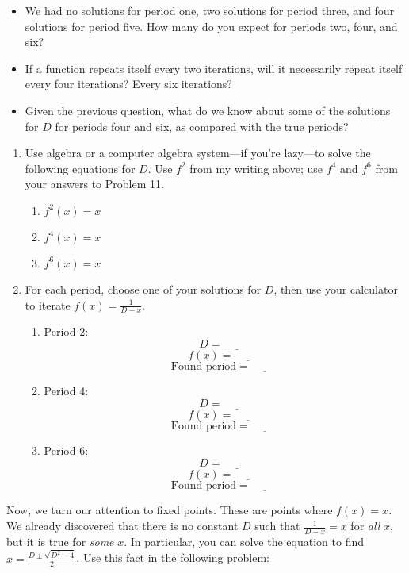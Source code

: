 \documentclass[../gatm.tex]{subfiles}
\begin{document}
\begin{itemize}
\item We had no solutions for period one, two solutions for period three, and four solutions for period five. How many do you expect for periods two, four, and six?
\item If a function repeats itself every two iterations, will it necessarily repeat itself every four iterations? Every six iterations?
\item Given the previous question, what do we know about some of the solutions for $D$ for periods four and six, as compared with the true periods?
\end{itemize}
\begin{enumerate}
\setcounter{enumi}{\value{problem_i}}
\item Use algebra or a computer algebra system---if you're lazy---to solve the following equations for $D$. Use $f^2$ from my writing above; use $f^4$ and $f^6$ from your answers to Problem 11.
\begin{multicols}{3}
\begin{enumerate}
\item $f^2(x)=x$
\item $f^4(x)=x$
\item $f^6(x)=x$
\end{enumerate}
\end{multicols}
\item For each period, choose one of your solutions for $D$, then use your calculator to iterate $f(x)=\frac{1}{D-x}$.
\begin{multicols}{3}
\begin{enumerate}
\item Period 2: $$D=\underline{\phantom{00000}}$$ $$f(x)=\underline{\phantom{00000}}$$ $$\text{Found period}=\underline{\phantom{00000}}$$
\item Period 4: $$D=\underline{\phantom{00000}}$$ $$f(x)=\underline{\phantom{00000}}$$ $$\text{Found period}=\underline{\phantom{00000}}$$
\item Period 6: $$D=\underline{\phantom{00000}}$$ $$f(x)=\underline{\phantom{00000}}$$ $$\text{Found period}=\underline{\phantom{00000}}$$
\end{enumerate}
\end{multicols}
\setcounter{problem_i}{\value{enumi}}
\end{enumerate}

Now, we turn our attention to fixed points. These are points where $f(x)=x$. We already discovered that there is no constant $D$ such that $\frac{1}{D-x}=x$ for \textit{all} $x$, but it is true for \textit{some} $x$. In particular, you can solve the equation to find $x=\frac{D\pm \sqrt{D^2-4}}{2}$. Use this fact in the following problem:
\end{document}
